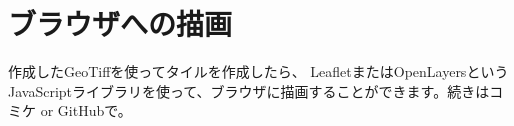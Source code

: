 \chapter*{ブラウザへの描画}
作成したGeoTiffを使ってタイルを作成したら、
LeafletまたはOpenLayersというJavaScriptライブラリを使って、ブラウザに描画することができます。続きはコミケ or GitHubで。


